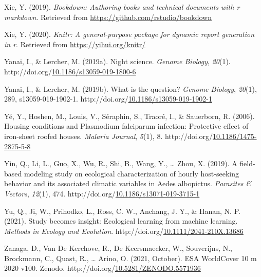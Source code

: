 \documentclass[12pt,twoside]{reedthesis}
\newlength{\cslhangindent}
\newenvironment{CSLReferences}[2] %
 {%
  \setlength{\parindent}{0pt}
  \ifodd #1 \everypar{\setlength{\hangindent}{\cslhangindent}}\ignorespaces\fi
  \ifnum #2 > 0
  \setlength{\parskip}{#2\baselineskip}
  \fi
 }%
 {}
\begin{document}
\begin{CSLReferences}{1}{0}
\leavevmode{}%
Xie, Y. (2019). \emph{Bookdown: Authoring books and technical documents with r markdown}. Retrieved from \url{https://github.com/rstudio/bookdown}

\leavevmode{}%
Xie, Y. (2020). \emph{Knitr: A general-purpose package for dynamic report generation in r}. Retrieved from \url{https://yihui.org/knitr/}

\leavevmode{}%
Yanai, I., \& Lercher, M. (2019a). Night science. \emph{Genome Biology}, \emph{20}(1). http://doi.org/\href{https://doi.org/10.1186/s13059-019-1800-6}{10.1186/s13059-019-1800-6}

\leavevmode{}%
Yanai, I., \& Lercher, M. (2019b). What is the question? \emph{Genome Biology}, \emph{20}(1), 289, s13059-019-1902-1. http://doi.org/\href{https://doi.org/10.1186/s13059-019-1902-1}{10.1186/s13059-019-1902-1}

\leavevmode{}%
Yé, Y., Hoshen, M., Louis, V., Séraphin, S., Traoré, I., \& Sauerborn, R. (2006). Housing conditions and {Plasmodium} falciparum infection: Protective effect of iron-sheet roofed houses. \emph{Malaria Journal}, \emph{5}(1), 8. http://doi.org/\href{https://doi.org/10.1186/1475-2875-5-8}{10.1186/1475-2875-5-8}

\leavevmode{}%
Yin, Q., Li, L., Guo, X., Wu, R., Shi, B., Wang, Y., \ldots{} Zhou, X. (2019). A field-based modeling study on ecological characterization of hourly host-seeking behavior and its associated climatic variables in {Aedes} albopictus. \emph{Parasites \& Vectors}, \emph{12}(1), 474. http://doi.org/\href{https://doi.org/10.1186/s13071-019-3715-1}{10.1186/s13071-019-3715-1}

\leavevmode{}%
Yu, Q., Ji, W., Prihodko, L., Ross, C. W., Anchang, J. Y., \& Hanan, N. P. (2021). Study becomes insight: {Ecological} learning from machine learning. \emph{Methods in Ecology and Evolution}. http://doi.org/\href{https://doi.org/10.1111/2041-210X.13686}{10.1111/2041-210X.13686}

\leavevmode{}%
Zanaga, D., Van De Kerchove, R., De Keersmaecker, W., Souverijns, N., Brockmann, C., Quast, R., \ldots{} Arino, O. (2021, October). {ESA} {WorldCover} 10 m 2020 v100. Zenodo. http://doi.org/\href{https://doi.org/10.5281/ZENODO.5571936}{10.5281/ZENODO.5571936}


\end{CSLReferences}
\end{document}
